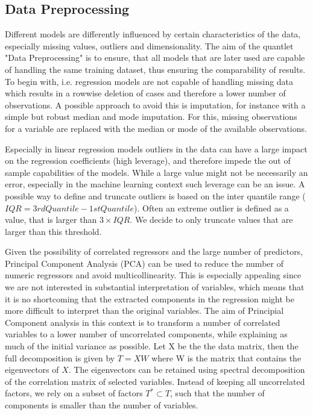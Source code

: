 \subsection{Data Preprocessing}\label{sec:data_theory}

Different models are differently influenced by certain characteristics of the data, especially missing values, outliers and dimensionality.  The aim of the quantlet "Data Preprocessing" is to ensure, that all models that are later used are capable of handling the same training dataset, thus ensuring the comparability of results. 
To begin with, i.e. regression models are not capable of handling missing data which results in a rowwise deletion of cases and therefore a lower number of observations. A possible approach to avoid this is  imputation, for instance with a simple but robust median and mode imputation. For this, missing observations for a variable are replaced with the median or mode of the available observations.

Especially in linear regression models outliers in the data can have a large impact on the regression coefficients (high leverage), and therefore impede the out of sample capabilities of the  models. While a large value might not be necessarily an error, especially in the machine learning context such leverage can be an issue. A possible way to define and truncate outliers is based on the inter quantile range ($IQR = 3rd Quantile -1st Quantile$).
Often an extreme outlier is defined as a value, that is larger than $3 \times IQR$. We decide to only truncate values that are larger than this threshold. 

Given the possibility of correlated regressors and the large number of predictors, Principal Component Analysis (PCA) can be used to reduce the number of numeric regressors and avoid multicollinearity. This is especially appealing since we are not interested in substantial interpretation of variables, which means that it is no shortcoming that the extracted components in the regression might be more difficult to interpret than the original variables. 
The aim of Principial Component analysis in this context is to transform a number of correlated variables to a lower number of uncorrelated components, while explaining as much of the initial variance as possible. 
Let X be the the data matrix, then the full decomposition is given by   $  T = XW $
where W is the matrix that contains the eigenvectors of $X$.  
The eigenvectors can be retained using spectral decomposition of the correlation matrix of selected variables.
Instead of keeping all uncorrelated factors, we rely on a subset of factors $T^* \subset T$, such that the number of components is smaller than the number of variables.
 
